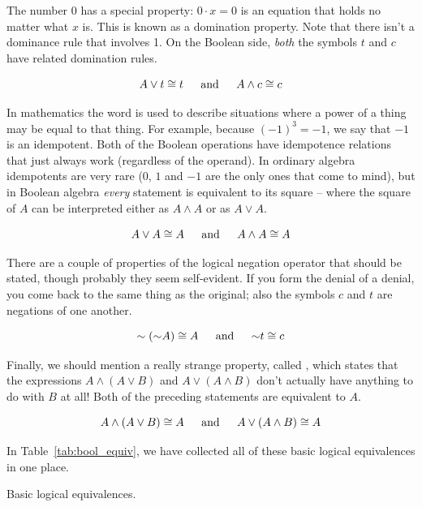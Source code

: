 The number 0 has a special property: $0 \cdot x = 0$ is an equation that 
holds no matter what $x$ is.  This is known as a domination property.  Note 
that there isn't a dominance rule that involves 1.
 On the Boolean side, 
{\em both} the symbols $t$ and $c$ have related domination rules.

\[ A \lor t \cong t \mbox{\rule{12pt}{0pt} and \rule{12pt}{0pt}} 
A \land c \cong c \]
 
In mathematics the word  is used to describe situations where 
a power of a thing may be equal to that thing.  For example, because $(-1)^3 = -1$, we say that $-1$ is an idempotent.  Both of the Boolean operations 
have idempotence relations that just always work (regardless of the operand).
In ordinary algebra idempotents are very rare ($0$, $1$ and $-1$ are the only
ones that come to mind), but in Boolean algebra {\em every} statement
is equivalent to its square -- where the square of $A$ can be interpreted 
either as $A \land A$ or as $A \lor A$.

\[ A \lor A \cong A \mbox{\rule{12pt}{0pt} and \rule{12pt}{0pt}}%
A \land A \cong A \]

There are a couple of properties of the logical negation operator 
that should be stated, though probably they seem self-evident.
If you form the denial of a denial, you come back to the 
same thing as the original; also the symbols $c$ and $t$ are negations
of one another.

\[ \lnot({\lnot}A) \cong A \mbox{\rule{12pt}{0pt} and \rule{12pt}{0pt}}%
{\lnot}t  \cong c \] 

Finally, we should mention a really strange property, called 
,
which states that the expressions $A \land (A \lor B)$ and $A \lor (A \land B)$
don't actually have anything to do with $B$ at all!  Both of the preceding
statements are equivalent to $A$.

\[ A \land (A \lor B) \cong A \mbox{\rule{12pt}{0pt} and \rule{12pt}{0pt}}%
A \lor (A \land B) \cong A \]

In Table~\ref{tab:bool_equiv}, we have collected all of these basic logical
equivalences in one place.

\begin{table}[hbt] 
\begin{center}

\end{center} 
\caption{Basic logical equivalences. }
\label{tab:bool_equiv}
\end{table}

